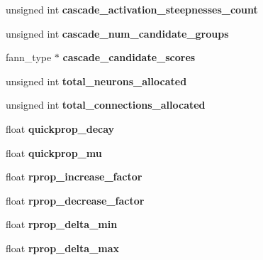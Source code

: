 \begin{DoxyCompactItemize}
\item 
\hypertarget{structfann_ad0f5383b8cccddfbeb0530bf3c894393}{unsigned int {\bfseries cascade\-\_\-activation\-\_\-steepnesses\-\_\-count}}\label{structfann_ad0f5383b8cccddfbeb0530bf3c894393}

\item 
\hypertarget{structfann_a38404a2830e13c99c412b0896371d290}{unsigned int {\bfseries cascade\-\_\-num\-\_\-candidate\-\_\-groups}}\label{structfann_a38404a2830e13c99c412b0896371d290}

\item 
\hypertarget{structfann_a8846080588ad0f4258d7e1f560c19cf0}{fann\-\_\-type $\ast$ {\bfseries cascade\-\_\-candidate\-\_\-scores}}\label{structfann_a8846080588ad0f4258d7e1f560c19cf0}

\item 
\hypertarget{structfann_a8a5578a358c931448a1c0cd6b4e549a3}{unsigned int {\bfseries total\-\_\-neurons\-\_\-allocated}}\label{structfann_a8a5578a358c931448a1c0cd6b4e549a3}

\item 
\hypertarget{structfann_a6104bfb916b334e88e7225c798110f82}{unsigned int {\bfseries total\-\_\-connections\-\_\-allocated}}\label{structfann_a6104bfb916b334e88e7225c798110f82}

\item 
\hypertarget{structfann_a2d5fe108dde14980b10145d79697052c}{float {\bfseries quickprop\-\_\-decay}}\label{structfann_a2d5fe108dde14980b10145d79697052c}

\item 
\hypertarget{structfann_a873ca9db6bce000c63c2f9dda35f4558}{float {\bfseries quickprop\-\_\-mu}}\label{structfann_a873ca9db6bce000c63c2f9dda35f4558}

\item 
\hypertarget{structfann_a6a10fc0b024846db7410be76084bb8f7}{float {\bfseries rprop\-\_\-increase\-\_\-factor}}\label{structfann_a6a10fc0b024846db7410be76084bb8f7}

\item 
\hypertarget{structfann_a83f7906982d1d33fddab337a86961731}{float {\bfseries rprop\-\_\-decrease\-\_\-factor}}\label{structfann_a83f7906982d1d33fddab337a86961731}

\item 
\hypertarget{structfann_a67b44f1e86d106d09f002b738d5e8173}{float {\bfseries rprop\-\_\-delta\-\_\-min}}\label{structfann_a67b44f1e86d106d09f002b738d5e8173}

\item 
\hypertarget{structfann_a40df085d8e44d4956c7c81efe4bad9c6}{float {\bfseries rprop\-\_\-delta\-\_\-max}}\label{structfann_a40df085d8e44d4956c7c81efe4bad9c6}


\end{DoxyCompactItemize}
